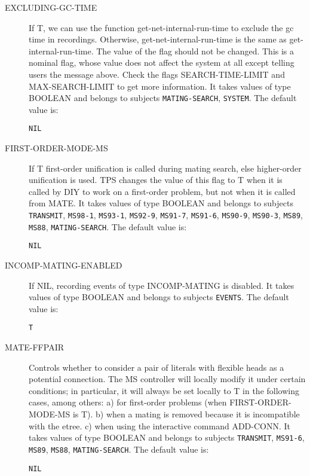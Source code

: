 \begin{description}
\item[EXCLUDING-GC-TIME]  
If T, we can use the function get-net-internal-run-time to exclude 
the gc time in recordings. Otherwise, get-net-internal-run-time is the
same as get-internal-run-time. The value of the flag should not be changed. 
This is a nominal flag, whose value does not affect the system at all except
telling users the message above. Check the flags SEARCH-TIME-LIMIT and
MAX-SEARCH-LIMIT to get more information.
It takes values of type BOOLEAN and belongs to subjects \texttt{MATING-SEARCH}, \texttt{SYSTEM}.  The default value is: \begin{lstlisting}
NIL
\end{lstlisting}

\item[FIRST-ORDER-MODE-MS]  
If T first-order unification is called during mating search, else
higher-order unification is used. TPS changes the value of this flag
to T when it is called by  DIY to work on a first-order problem,
but not when it is called from MATE.
It takes values of type BOOLEAN and belongs to subjects \texttt{TRANSMIT}, \texttt{MS98-1}, \texttt{MS93-1}, \texttt{MS92-9}, \texttt{MS91-7}, \texttt{MS91-6}, \texttt{MS90-9}, \texttt{MS90-3}, \texttt{MS89}, \texttt{MS88}, \texttt{MATING-SEARCH}.  The default value is: \begin{lstlisting}
NIL
\end{lstlisting}

\item[INCOMP-MATING-ENABLED]  
If NIL, recording events of type INCOMP-MATING is disabled.
It takes values of type BOOLEAN and belongs to subjects \texttt{EVENTS}.  The default value is: \begin{lstlisting}
T
\end{lstlisting}

\item[MATE-FFPAIR]  
Controls whether to consider a pair of literals with flexible
heads as a potential connection. The MS controller will locally modify
it under certain conditions; in particular, it will always be set locally
to T in the following cases, among others:
a) for first-order problems (when FIRST-ORDER-MODE-MS is T).
b) when a mating is removed because it is incompatible with the etree.
c) when using the interactive command ADD-CONN.
It takes values of type BOOLEAN and belongs to subjects \texttt{TRANSMIT}, \texttt{MS91-6}, \texttt{MS89}, \texttt{MS88}, \texttt{MATING-SEARCH}.  The default value is: \begin{lstlisting}
NIL
\end{lstlisting}


\end{description}
